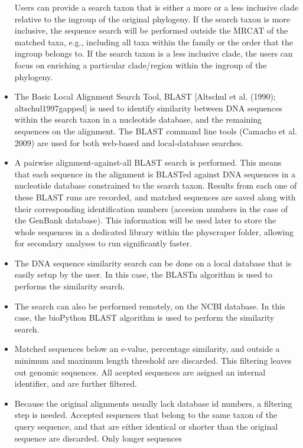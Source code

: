 \documentclass[draft]{ametsoc}
\begin{document}
\begin{itemize}
  Users can provide a search taxon that is either a more or a less
  inclusive clade relative to the ingroup of the original phylogeny. If
  the search taxon is more inclusive, the sequence search will be
  performed outside the MRCAT of the matched taxa, e.g., including all
  taxa within the family or the order that the ingroup belongs to. If
  the search taxon is a less inclusive clade, the users can focus on
  enriching a particular clade/region within the ingroup of the
  phylogeny.
\item
  The Basic Local Alignment Search Tool, BLAST {[}Altschul et al.
  (1990); altschul1997gapped{]} is used to identify similarity between
  DNA sequences within the search taxon in a nucleotide database, and
  the remaining sequences on the alignment. The BLAST command line tools
  (Camacho et al. 2009) are used for both web-based and local-database
  searches. 
\item
  A pairwise alignment-against-all BLAST search is performed. This means
  that each sequence in the alignment is BLASTed against DNA sequences
  in a nucleotide database constrained to the search taxon. Results from
  each one of these BLAST runs are recorded, and matched sequences are
  saved along with their corresponding identification numbers (accesion
  numbers in the case of the GenBank database). This information will be
  used later to store the whole sequences in a dedicated library within
  the physcraper folder, allowing for secondary analyses to run
  significantly faster.
\item
  The DNA sequence similarity search can be done on a local database
  that is easily setup by the user. In this case, the BLASTn algorithm
  is used to performs the similarity search.
\item
  The search can also be performed remotely, on the NCBI database. In
  this case, the bioPython BLAST algorithm is used to perform the
  similarity search.
\item
  Matched sequences below an e-value, percentage similarity, and outside
  a minimum and maximum length threshold are discarded. This filtering
  leaves out genomic sequences. All acepted sequences are asigned an
  internal identifier, and are further filtered.
\item
  Because the original alignments usually lack database id numbers, a
  filtering step is needed. Accepted sequences that belong to the same
  taxon of the query sequence, and that are either identical or shorter
  than the original sequence are discarded. Only longer sequences

\end{itemize}
\end{document}

